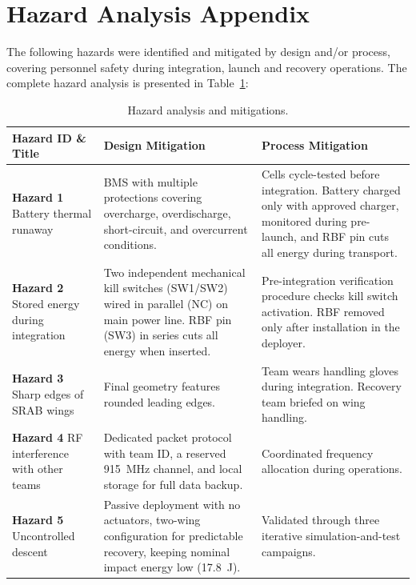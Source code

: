 \section*{Hazard Analysis Appendix}

The following hazards were identified and mitigated by design and/or
process, covering personnel safety during integration, launch and
recovery operations. The complete hazard analysis is presented in
Table~\ref{tab:hazards}:

\vspace{0.3cm}

\begin{table}[htbp]
\centering
\small
\setlength{\tabcolsep}{6pt}
\begin{tabularx}{\textwidth}{p{3.5cm} X X} 
\toprule
\textbf{Hazard ID \& Title} & \textbf{Design Mitigation} & \textbf{Process Mitigation} \\
\midrule

\textbf{Hazard 1} \newline Battery thermal runaway &
BMS with multiple protections covering overcharge, overdischarge, short-circuit, and overcurrent conditions. &
Cells cycle-tested before integration. Battery charged only with approved charger, monitored during pre-launch, and RBF pin cuts all energy during transport. \\
\addlinespace

\textbf{Hazard 2} \newline Stored energy during integration &
Two independent mechanical kill switches (SW1/SW2) wired in parallel (NC) on main power line. RBF pin (SW3) in series cuts all energy when inserted. &
Pre-integration verification procedure checks kill switch activation. RBF removed only after installation in the deployer. \\
\addlinespace

\textbf{Hazard 3} \newline Sharp edges of SRAB wings &
Final geometry features rounded leading edges. &
Team wears handling gloves during integration. Recovery team briefed on wing handling. \\
\addlinespace

\textbf{Hazard 4} \newline RF interference with other teams &
Dedicated packet protocol with team ID, a reserved 915~MHz channel, and local storage for full data backup. &
Coordinated frequency allocation during operations. \\
\addlinespace

\textbf{Hazard 5} \newline Uncontrolled descent &
Passive deployment with no actuators, two-wing configuration for predictable recovery, keeping nominal impact energy low (17.8~J). &
Validated through three iterative simulation-and-test campaigns. \\

\bottomrule
\end{tabularx}
\caption{Hazard analysis and mitigations.}
\label{tab:hazards}
\end{table}
